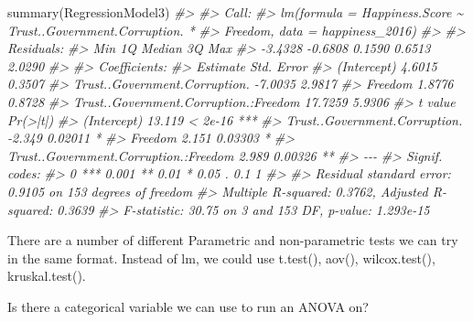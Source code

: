 \documentclass[
]{book}
\newenvironment{Shaded}{\begin{snugshade}}{\end{snugshade}}
\newcommand{\CommentTok}[1]{\textcolor[rgb]{0.56,0.35,0.01}{\textit{#1}}}
\newcommand{\FunctionTok}[1]{\textcolor[rgb]{0.00,0.00,0.00}{#1}}
\newcommand{\NormalTok}[1]{#1}
\theoremstyle{definition}
\theoremstyle{definition}
\theoremstyle{definition}
\theoremstyle{definition}
\theoremstyle{remark}
\begin{document}
\begin{Shaded}
\begin{Highlighting}[]
\FunctionTok{summary}\NormalTok{(RegressionModel3)}
\CommentTok{\#\textgreater{} }
\CommentTok{\#\textgreater{} Call:}
\CommentTok{\#\textgreater{} lm(formula = Happiness.Score \textasciitilde{} Trust..Government.Corruption. * }
\CommentTok{\#\textgreater{}     Freedom, data = happiness\_2016)}
\CommentTok{\#\textgreater{} }
\CommentTok{\#\textgreater{} Residuals:}
\CommentTok{\#\textgreater{}     Min      1Q  Median      3Q     Max }
\CommentTok{\#\textgreater{} {-}3.4328 {-}0.6808  0.1590  0.6513  2.0290 }
\CommentTok{\#\textgreater{} }
\CommentTok{\#\textgreater{} Coefficients:}
\CommentTok{\#\textgreater{}                                       Estimate Std. Error}
\CommentTok{\#\textgreater{} (Intercept)                             4.6015     0.3507}
\CommentTok{\#\textgreater{} Trust..Government.Corruption.          {-}7.0035     2.9817}
\CommentTok{\#\textgreater{} Freedom                                 1.8776     0.8728}
\CommentTok{\#\textgreater{} Trust..Government.Corruption.:Freedom  17.7259     5.9306}
\CommentTok{\#\textgreater{}                                       t value Pr(\textgreater{}|t|)    }
\CommentTok{\#\textgreater{} (Intercept)                            13.119  \textless{} 2e{-}16 ***}
\CommentTok{\#\textgreater{} Trust..Government.Corruption.          {-}2.349  0.02011 *  }
\CommentTok{\#\textgreater{} Freedom                                 2.151  0.03303 *  }
\CommentTok{\#\textgreater{} Trust..Government.Corruption.:Freedom   2.989  0.00326 ** }
\CommentTok{\#\textgreater{} {-}{-}{-}}
\CommentTok{\#\textgreater{} Signif. codes:  }
\CommentTok{\#\textgreater{} 0 \textquotesingle{}***\textquotesingle{} 0.001 \textquotesingle{}**\textquotesingle{} 0.01 \textquotesingle{}*\textquotesingle{} 0.05 \textquotesingle{}.\textquotesingle{} 0.1 \textquotesingle{} \textquotesingle{} 1}
\CommentTok{\#\textgreater{} }
\CommentTok{\#\textgreater{} Residual standard error: 0.9105 on 153 degrees of freedom}
\CommentTok{\#\textgreater{} Multiple R{-}squared:  0.3762, Adjusted R{-}squared:  0.3639 }
\CommentTok{\#\textgreater{} F{-}statistic: 30.75 on 3 and 153 DF,  p{-}value: 1.293e{-}15}
\end{Highlighting}
\end{Shaded}

There are a number of different Parametric and non-parametric tests we can try in the same format. Instead of lm, we could use t.test(), aov(), wilcox.test(), kruskal.test().

Is there a categorical variable we can use to run an ANOVA on?
\end{document}
